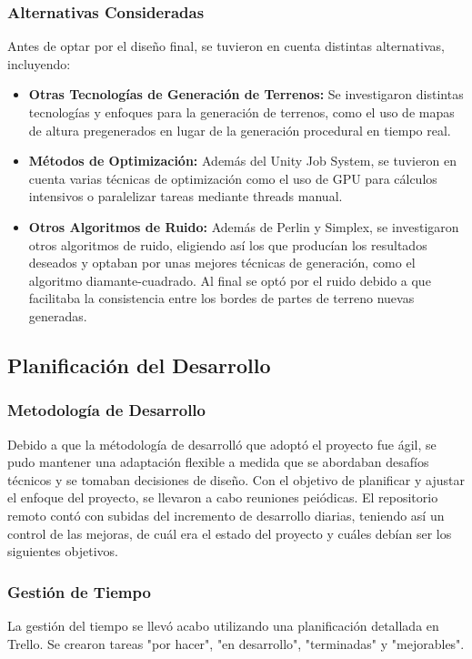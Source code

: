 \subsubsection{Alternativas Consideradas}
Antes de optar por el diseño final, se tuvieron en cuenta distintas alternativas, incluyendo:

\begin{itemize}
    \item \textbf{Otras Tecnologías de Generación de Terrenos:} Se investigaron distintas tecnologías y enfoques para la generación de terrenos, como el uso de mapas de altura pregenerados en lugar de la generación procedural en tiempo real.
    
    \item \textbf{Métodos de Optimización:} Además del Unity Job System, se tuvieron en cuenta varias técnicas de optimización como el uso de GPU para cálculos intensivos o paralelizar tareas mediante threads manual.
    
    \item \textbf{Otros Algoritmos de Ruido:} Además de Perlin y Simplex, se investigaron otros algoritmos de ruido, eligiendo así los que producían los resultados deseados y optaban por unas mejores técnicas de generación, como el algoritmo diamante-cuadrado. Al final se optó por el ruido debido a que facilitaba la consistencia entre los bordes de partes de terreno nuevas generadas.
\end{itemize}

\subsection{Planificación del Desarrollo}

\subsubsection{Metodología de Desarrollo}
Debido a que la métodología de desarrolló que adoptó el proyecto fue ágil, se pudo mantener una adaptación flexible a medida que se abordaban desafíos técnicos y se tomaban decisiones de diseño. Con el objetivo de planificar y ajustar el enfoque del proyecto, se llevaron a cabo reuniones peiódicas. El repositorio remoto contó con subidas del incremento de desarrollo diarias, teniendo así un control de las mejoras, de cuál era el estado del proyecto y cuáles debían ser los siguientes objetivos.

\subsubsection{Gestión de Tiempo}
La gestión del tiempo se llevó acabo utilizando una planificación detallada en Trello. Se crearon tareas "por hacer", "en desarrollo", "terminadas" y "mejorables".

